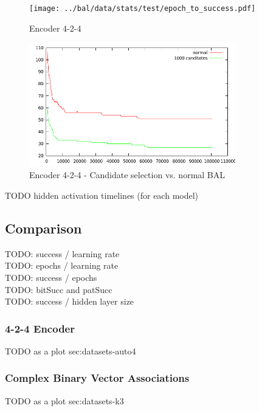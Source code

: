 \begin{figure}[t]
  \centering
  \texttt{[image: ../bal/data/stats/test/epoch\_to\_success.pdf]}    
  \caption{Encoder 4-2-4}
  \label{fig:TODO-3} 
\end{figure}

\begin{figure}[t]
  \centering
  \includegraphics[width=0.8\textwidth]{../presentation/img/long_run_error.png}    
  \caption{Encoder 4-2-4 - Candidate selection vs. normal BAL}
  \label{fig:TODO-4}
\end{figure}

TODO hidden activation timelines (for each model) 

\subsection{Comparison} 

TODO: success / learning rate \\
TODO: epochs / learning rate  \\
TODO: success / epochs  \\
TODO: bitSucc and patSucc \\
TODO: success / hidden layer size  \\
 
\subsubsection{4-2-4 Encoder}
TODO as a plot {sec:datasets-auto4} 

\subsubsection{Complex Binary Vector Associations}
TODO as a plot {sec:datasets-k3} 

